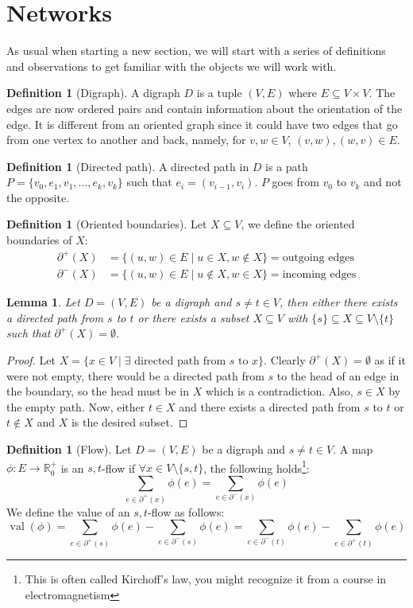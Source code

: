 \documentclass{tufte-handout}
\newtheorem{lem}[thm]{Lemma}
\theoremstyle{definition}
\newtheorem{defn}[thm]{Definition}
\theoremstyle{remark}
\newcommand{\R}{\mathbb{R}}
\DeclareMathOperator{\val}{val}
\begin{document}
\section{Networks}
As usual when starting a new section, we will start with a series of definitions and observations to get familiar with the objects we will work with.
\begin{defn}[Digraph]
	A digraph $D$ is a tuple $(V,E)$ where $E \subseteq V \times V$. The edges are now ordered pairs and contain information about the orientation of the edge. It is different from an oriented graph since it could have two edges that go from one vertex to another and back, namely, for $v,w \in V$, $(v,w), (w,v) \in E$.
\end{defn}
\begin{defn}[Directed path]
	A directed path in $D$ is a path $P = \{v_0,e_1,v_1, \dots, e_k, v_k\}$ such that $e_i = (v_{i-1},v_i)$. $P$ goes from $v_0$ to $v_k$ and not the opposite.
\end{defn}
\begin{defn}[Oriented boundaries]
	Let $X \subseteq V$, we define the oriented boundaries of $X$:
	\begin{align*}
		\partial^+(X) &= \{ (u,w) \in E \mid u \in X, w \notin X \} = \mbox{outgoing edges}\\
		\partial^-(X) &= \{ (u,w) \in E \mid u \notin X, w \in X \} = \mbox{incoming edges}
	\end{align*}
\end{defn}
\begin{lem}
	Let $D = (V,E)$ be a digraph and $s \neq t \in V$, then either there exists a directed path from $s$ to $t$ or there exists a subset $X \subseteq V$ with $\{s\} \subseteq X \subseteq V \setminus\{t\}$ such that $\partial^+(X) = \emptyset$.
\end{lem}
\begin{proof}
	Let $X = \{x \in V \mid \exists \mbox{ directed path from } s \mbox{ to } x \}$. Clearly $\partial^+(X) = \emptyset$ as if it were not empty, there would be a directed path from $s$ to the head of an edge in the boundary, so the head must be in $X$ which is a contradiction. Also, $s \in X$ by the empty path. Now, either $t \in X$ and there exists a directed path from $s$ to $t$ or $t \notin X$ and $X$ is the desired subset.  
\end{proof}
\begin{defn}[Flow]
	Let $D= (V,E)$ be a digraph and $s\neq t \in V$. A map $\phi : E \rightarrow \R^+_0$ is an $s,t$-flow if $\forall x \in V \setminus\{s,t\}$, the following holds\footnote{This is often called Kirchoff's law, you might recognize it from a course in electromagnetism}:
	\[ \sum_{e \in \partial^+(x)}\phi(e) = \sum_{e \in \partial^-(x)}\phi(e) \]
	We define the value of an $s,t$-flow as follows:
	\[ \val(\phi) = \sum_{e \in \partial^+(s)}\phi(e) - \sum_{e \in \partial^-(s)}\phi(e) = \sum_{e \in \partial^-(t)}\phi(e) - \sum_{e \in \partial^+(t)}\phi(e)\]
\end{defn}
\end{document}
